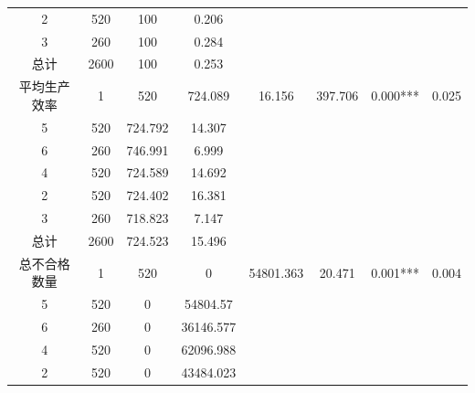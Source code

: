\documentclass[withoutpreface,bwprint]{cumcmthesis}
\begin{document}
\begin{table}[htbp]
{\begin{tabular}{cccccccc}
    2            & 520           & 100          & 0.206        &              &              &            &                     \\
    3            & 260           & 100          & 0.284        &              &              &            &                     \\
    总计           & 2600          & 100          & 0.253        &              &              &            &                     \\ \midrule
    平均生产效率       & 1             & 520          & 724.089      & 16.156       & 397.706      & 0.000***   & 0.025               \\ \midrule
    5            & 520           & 724.792      & 14.307       &              &              &            &                     \\
    6            & 260           & 746.991      & 6.999        &              &              &            &                     \\
    4            & 520           & 724.589      & 14.692       &              &              &            &                     \\
    2            & 520           & 724.402      & 16.381       &              &              &            &                     \\
    3            & 260           & 718.823      & 7.147        &              &              &            &                     \\
    总计           & 2600          & 724.523      & 15.496       &              &              &            &                     \\ \midrule
    总不合格数量       & 1             & 520          & 0            & 54801.363    & 20.471       & 0.001***   & 0.004               \\ \midrule
    5            & 520           & 0            & 54804.57     &              &              &            &                     \\
    6            & 260           & 0            & 36146.577    &              &              &            &                     \\
    4            & 520           & 0            & 62096.988    &              &              &            &                     \\
    2            & 520           & 0            & 43484.023    &              &              &            &                     \\

\end{tabular}}
\end{table}
\end{document}
